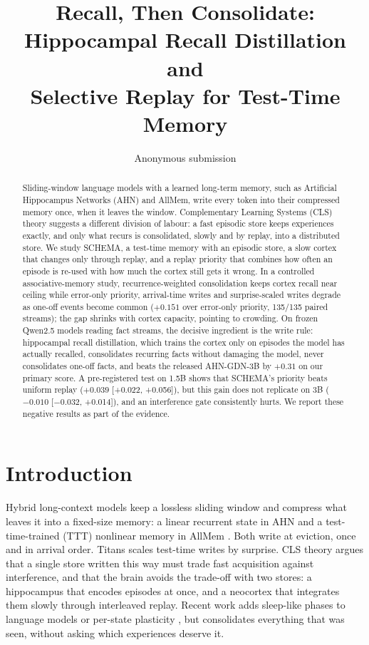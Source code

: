 \documentclass[letterpaper,10pt,twocolumn]{article}
\title{\Large\bf Recall, Then Consolidate: Hippocampal Recall Distillation and\\ Selective Replay for Test-Time Memory}
\author{Anonymous submission}
\date{}
\begin{document}
\maketitle
\begin{abstract}
Sliding-window language models with a learned long-term memory, such as Artificial Hippocampus Networks (AHN) and AllMem, write every token into their compressed memory once, when it leaves the window. Complementary Learning Systems (CLS) theory suggests a different division of labour: a fast episodic store keeps experiences exactly, and only what recurs is consolidated, slowly and by replay, into a distributed store. We study SCHEMA, a test-time memory with an episodic store, a slow cortex that changes only through replay, and a replay priority that combines how often an episode is re-used with how much the cortex still gets it wrong. In a controlled associative-memory study, recurrence-weighted consolidation keeps cortex recall near ceiling while error-only priority, arrival-time writes and surprise-scaled writes degrade as one-off events become common ($+0.151$ over error-only priority, 135/135 paired streams); the gap shrinks with cortex capacity, pointing to crowding. On frozen Qwen2.5 models reading fact streams, the decisive ingredient is the write rule: hippocampal recall distillation, which trains the cortex only on episodes the model has actually recalled, consolidates recurring facts without damaging the model, never consolidates one-off facts, and beats the released AHN-GDN-3B by $+0.31$ on our primary score. A pre-registered test on 1.5B shows that SCHEMA's priority beats uniform replay ($+0.039$ [+0.022, +0.056]), but this gain does not replicate on 3B ($-0.010$ [$-0.032$, +0.014]), and an interference gate consistently hurts. We report these negative results as part of the evidence.
\end{abstract}

\section{Introduction}
Hybrid long-context models keep a lossless sliding window and compress what leaves it into a fixed-size memory: a linear recurrent state in AHN \cite{ahn} and a test-time-trained (TTT) nonlinear memory in AllMem \cite{allmem}. Both write at eviction, once and in arrival order. Titans \cite{titans} scales test-time writes by surprise. CLS theory \cite{mcclelland,kumaran} argues that a single store written this way must trade fast acquisition against interference, and that the brain avoids the trade-off with two stores: a hippocampus that encodes episodes at once, and a neocortex that integrates them slowly through interleaved replay. Recent work adds sleep-like phases to language models \cite{lee_sleep,behrouz_sleep} or per-state plasticity \cite{palimpsa}, but consolidates everything that was seen, without asking which experiences deserve it.
\end{document}
